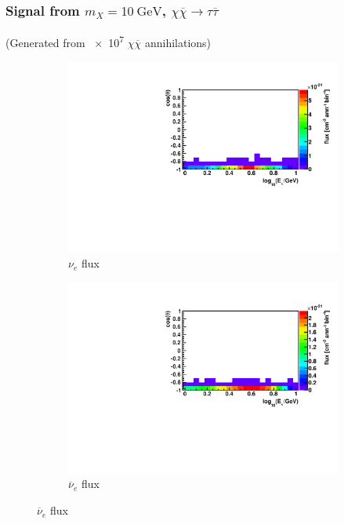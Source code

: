 \documentclass{beamer}
\begin{document}
\begin{frame}
	\frametitle{Signal from $m_X = \SI{10}{\giga\electronvolt}$,
		$\chi \overline{\chi} \rightarrow \tau \overline{\tau}$}
	(Generated from \num{e7} $\chi \overline{\chi}$ annihilations)
	\begin{figure}
		\centering
		\begin{subfigure}[b]{0.49\linewidth}
			\caption*{ $\nu_{e}$ flux }
			\includegraphics[width=\linewidth]{hist_flux_nue_from_10gev_mx_to_tautaubar.pdf}
		\end{subfigure}
		\begin{subfigure}[b]{0.49\linewidth}
			\caption*{ $\overline{\nu}_{e}$ flux }
			\includegraphics[width=\linewidth]{hist_flux_nuebar_from_10gev_mx_to_tautaubar.pdf}
		\end{subfigure}
	\end{figure}
\end{frame}
\end{document}

